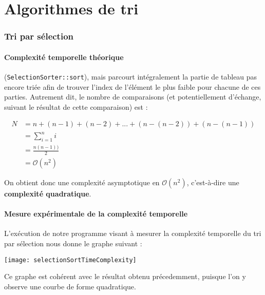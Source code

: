 \part{Algorithmes de tri}

  \section{Tri par sélection}

    \subsection{Complexité temporelle théorique}

      \makebox[\textwidth-\parindent][s]{Le tri par sélection itère sur le tableau lors de l'appel à sa méthode principale}
      (\texttt{SelectionSorter::sort}),
      mais parcourt intégralement la partie de tableau pas encore triée
      afin de trouver l'index de l'élément le plus faible pour chacune de ces parties.
      Autrement dit, le nombre de comparaisons (et potentiellement d'échange, suivant le résultat de cette comparaison)
      est :

      \begin{align*}
       N &= n + (n - 1) + (n - 2) + ... + (n - (n-2)) + (n - (n-1)) \\
           &= \sum_{i = 1}^{n} i \\
           &= \frac{n(n-1))}{2} \\
           &= \mathcal{O}(n^2)
      \end{align*}

      On obtient donc une complexité asymptotique en $\mathcal{O}(n^2)$, c'est-à-dire une \textbf{complexité quadratique}.

    \subsection{Mesure expérimentale de la complexité temporelle}

    L'exécution de notre programme visant à mesurer la complexité temporelle du tri par sélection nous donne le
    graphe suivant :


    \begin{center}
      \texttt{[image: selectionSortTimeComplexity]}
    \end{center}

    Ce graphe est cohérent avec le résultat obtenu précedemment, puisque l'on y observe une courbe de forme quadratique.

